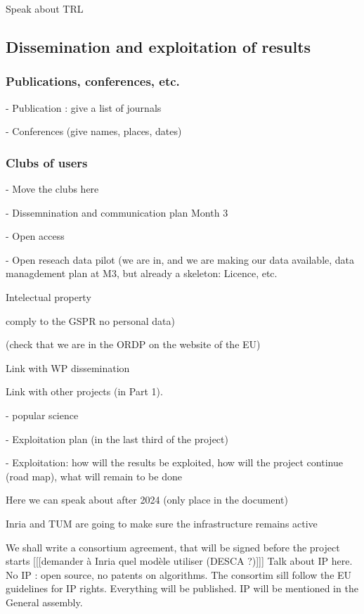 {\color{red} Speak about TRL}

\subsection{Dissemination and exploitation of results}

\subsubsection*{Publications, conferences, etc.}

- Publication : give a list of journals 

- Conferences (give names, places, dates)


\subsubsection*{Clubs of users}

- Move the clubs here


- Dissemnination and communication plan Month 3

- Open access

- Open reseach data pilot (we are in, and we are making our data available,
data managdement plan at M3, but already a skeleton: Licence, etc.

Intelectual property

comply to the GSPR no personal data)

(check that we are in the ORDP on the website of the EU)

Link with WP dissemination

Link with other projects (in Part 1).

- popular science

- Exploitation plan (in the last third of the project)

- Exploitation: how will the results be exploited, how will the project
continue (road map), what will remain to be done

Here we can speak about after 2024 (only place in the document)

Inria and TUM are going to make sure the infrastructure remains active

We shall write a consortium agreement, that will be signed before the
project starts [[[demander à Inria quel modèle utiliser (DESCA ?)]]]
Talk about IP here. No IP : open source, no patents on algorithms.
The consortim sill follow the EU guidelines for IP rights.
Everything will be published. IP will be mentioned in the General assembly.




